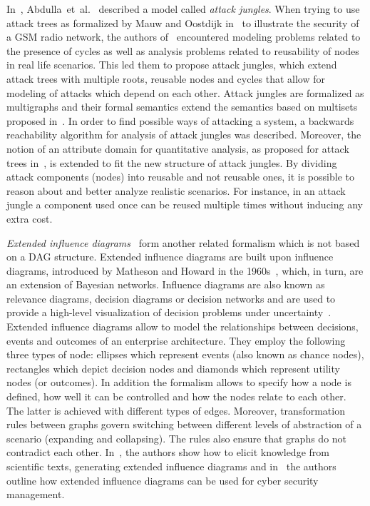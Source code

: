 \documentclass[a4paper]{article}
\begin{document}
In~, Abdulla~et~al.~\cite{AbCeKa} described a model called \emph{attack 
jungles}. When trying to use attack trees as formalized by Mauw and Oostdijk 
in~\cite{MaOo} to illustrate the security of a GSM radio network, the authors 
of~\cite{AbCeKa} encountered modeling problems related to the presence of 
cycles as well as analysis problems related to reusability of nodes in real 
life scenarios. This led them to propose attack jungles, which extend attack 
trees with multiple roots, reusable nodes and cycles that allow for modeling  of
attacks which depend on each other. Attack jungles are formalized as 
multigraphs and their formal semantics extend the semantics based on multisets 
proposed in~\cite{MaOo}. In order to find possible ways of attacking a system, 
a backwards reachability algorithm for analysis of attack jungles was 
described. Moreover, the notion of an attribute domain for quantitative 
analysis, as proposed for attack trees in~\cite{MaOo}, is extended to fit the 
new structure of attack jungles. By dividing attack components (nodes)  into
reusable and not reusable ones, it is possible to reason about and better 
analyze realistic scenarios. For instance, in an attack jungle a component  used
once can be reused multiple times without inducing any extra cost. 

\emph{Extended influence diagrams}~\cite{JoLaNaSi} form another related
formalism which is not based on a DAG structure. Extended influence diagrams are
built upon influence diagrams, introduced by Matheson and Howard in the
1960s~\cite{MaHo}, which, in turn, are an extension of Bayesian networks. 
Influence diagrams are also known as relevance diagrams, decision diagrams or
decision networks and are used to provide a high-level visualization of decision
problems under uncertainty~\cite{EzBe2010}. Extended influence diagrams allow to
model the relationships between decisions, events and outcomes of an enterprise
architecture. They employ the following three types of node: ellipses which
represent events (also known as chance nodes), rectangles which depict decision
nodes and diamonds which represent utility nodes (or outcomes). In addition the
formalism allows to specify how a node is defined, how well it can be controlled
and how the nodes relate to each other. The latter is achieved with different
types of edges. Moreover, transformation rules between graphs govern switching
between different levels of abstraction of a scenario (expanding and
collapsing). The rules also ensure that graphs do not contradict each other.
In~\cite{LaJoNa}, the authors show how to elicit knowledge from scientific
texts, generating extended influence diagrams and in~\cite{EkSo} the authors
outline how extended influence diagrams can be used for cyber security
management.
\end{document}
